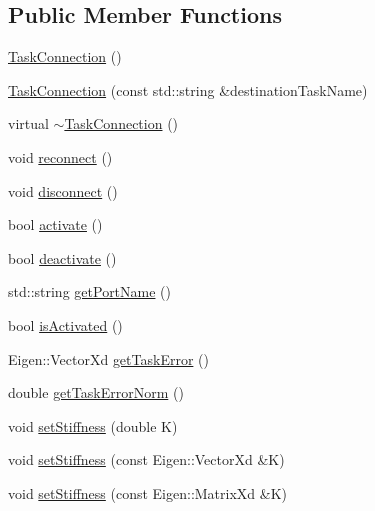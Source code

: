 \subsection*{Public Member Functions}
\begin{DoxyCompactItemize}
\item 
\hyperlink{classocra__recipes_1_1TaskConnection_a57b78d2652778a07949377622e86e5d7}{Task\+Connection} ()
\item 
\hyperlink{classocra__recipes_1_1TaskConnection_a8a7b431e1c53e50428e3c369892d266e}{Task\+Connection} (const std\+::string \&destination\+Task\+Name)
\item 
virtual \hyperlink{classocra__recipes_1_1TaskConnection_aa2a733dfaa80f32fa95f45c2d98f6106}{$\sim$\+Task\+Connection} ()
\item 
void \hyperlink{classocra__recipes_1_1TaskConnection_a416154f1cd736647003442d905b9862e}{reconnect} ()
\item 
void \hyperlink{classocra__recipes_1_1TaskConnection_a66f5d60e3690f959135319ed85778de8}{disconnect} ()
\item 
bool \hyperlink{classocra__recipes_1_1TaskConnection_a64c0f6623daace3ac9030ec620ed98a2}{activate} ()
\item 
bool \hyperlink{classocra__recipes_1_1TaskConnection_a8488250380b7fd9598f3246ec6111d6a}{deactivate} ()
\item 
std\+::string \hyperlink{classocra__recipes_1_1TaskConnection_a9898d85644f690d4b0e5d5a2c8338d63}{get\+Port\+Name} ()
\item 
bool \hyperlink{classocra__recipes_1_1TaskConnection_a07179a0e687fd28d091eeebb1157fac0}{is\+Activated} ()
\item 
Eigen\+::\+Vector\+Xd \hyperlink{classocra__recipes_1_1TaskConnection_ab968ad0f0a818f240eed58f1780f8586}{get\+Task\+Error} ()
\item 
double \hyperlink{classocra__recipes_1_1TaskConnection_a2639764e4b7fe55aa29dce82a2268b3a}{get\+Task\+Error\+Norm} ()
\item 
void \hyperlink{classocra__recipes_1_1TaskConnection_a4db37203b270702fda22a81ef15b1a77}{set\+Stiffness} (double K)
\item 
void \hyperlink{classocra__recipes_1_1TaskConnection_afcd68e61fdaadfe705b62194f07f7a3a}{set\+Stiffness} (const Eigen\+::\+Vector\+Xd \&K)
\item 
void \hyperlink{classocra__recipes_1_1TaskConnection_adc34c0f28b0833548d72346823e58489}{set\+Stiffness} (const Eigen\+::\+Matrix\+Xd \&K)
\item 

\end{DoxyCompactItemize}
